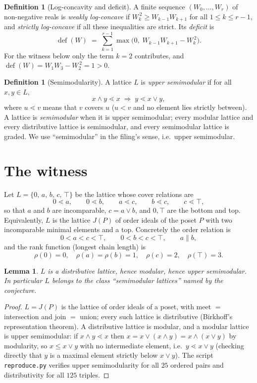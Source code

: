 \documentclass[11pt]{article}
\newtheorem{lemma}[theorem]{Lemma}
\theoremstyle{definition}
\newtheorem{definition}[theorem]{Definition}
\theoremstyle{remark}
\newcommand{\meet}{\wedge}
\newcommand{\join}{\vee}
\newcommand{\covers}{\lessdot}
\begin{document}
\begin{definition}[Log-concavity and deficit]
A finite sequence $(W_0,\dots,W_r)$ of non-negative reals is \emph{weakly
log-concave} if $W_k^{\,2} \ge W_{k-1} W_{k+1}$ for all $1\le k\le r-1$, and
\emph{strictly log-concave} if all these inequalities are strict. Its
\emph{deficit} is
\[
\operatorname{def}(W)
\;=\; \sum_{k=1}^{r-1} \max\bigl(0,\; W_{k-1}W_{k+1} - W_k^{\,2}\bigr).
\]
For the witness below only the term $k=2$ contributes, and
$\operatorname{def}(W) = W_1W_3 - W_2^{\,2} = 1 > 0$.
\end{definition}

\begin{definition}[Semimodularity]\label{def:semimod}
A lattice $L$ is \emph{upper semimodular} if for all $x,y\in L$,
\[
x\meet y \covers x \;\Longrightarrow\; y \covers x\join y ,
\]
where $u \covers v$ means that $v$ covers $u$ ($u < v$ and no element lies
strictly between). A lattice is \emph{semimodular} when it is upper
semimodular; every modular lattice and every distributive lattice is
semimodular, and every semimodular lattice is graded. We use ``semimodular''
in the filing's sense, i.e.\ upper semimodular.
\end{definition}

\section{The witness}\label{sec:witness}

Let $L = \{0,\,a,\,b,\,c,\,\top\}$ be the lattice whose cover relations are
\[
0 \covers a, \qquad 0 \covers b, \qquad a \covers c, \qquad b \covers c,
\qquad c \covers \top ,
\]
so that $a$ and $b$ are incomparable, $c = a \join b$, and $0,\top$ are the
bottom and top. Equivalently, $L$ is the lattice $J(P)$ of order ideals of the
poset $P$ with two incomparable minimal elements and a top. Concretely the
order relation is
\[
0 < a < c < \top, \qquad 0 < b < c < \top, \qquad a \parallel b ,
\]
and the rank function (longest chain length) is
\[
\rho(0)=0,\quad \rho(a)=\rho(b)=1,\quad \rho(c)=2,\quad \rho(\top)=3 .
\]

\begin{lemma}\label{lem:lattice}
$L$ is a distributive lattice, hence modular, hence upper semimodular. In
particular $L$ belongs to the class ``semimodular lattices'' named by the
conjecture.
\end{lemma}

\begin{proof}
$L = J(P)$ is the lattice of order ideals of a poset, with meet $=$ intersection
and join $=$ union; every such lattice is distributive (Birkhoff's
representation theorem). A distributive lattice is modular, and a modular
lattice is upper semimodular: if $x\meet y \covers x$ then
$x = x \join (x \meet y) = x \meet (x \join y)$ by modularity, so
$x \le x\join y$ with no intermediate element, i.e.\ $y \covers x \join y$
(checking directly that $y$ is a maximal element strictly below $x\join y$).
The script \texttt{reproduce.py} verifies upper semimodularity for all $25$
ordered pairs and distributivity for all $125$ triples.
\end{proof}
\end{document}
